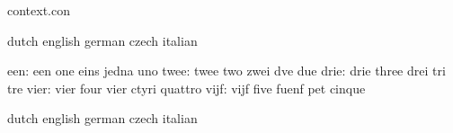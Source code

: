 


\startlogginginterface context.con



\startvariables            dutch                     english
                           german                    czech
                           italian

                      een: een                       one
                           eins                      jedna
                           uno
                     twee: twee                      two
                           zwei                      dve
                           due
                     drie: drie                      three
                           drei                      tri
                           tre
                     vier: vier                      four
                           vier                      ctyri
                           quattro
                     vijf: vijf                      five
                           fuenf                     pet
                           cinque
\stopvariables




\startvariables            dutch                     english
                           german                    czech
                           italian


